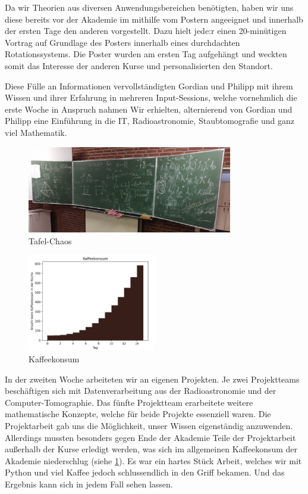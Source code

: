 Da wir Theorien aus diversen Anwendungsbereichen benötigten, haben wir uns diese bereits vor der Akademie im mithilfe vom Postern angeeignet und innerhalb der ersten Tage den anderen vorgestellt.
Dazu hielt jede:r einen 20-minütigen Vortrag auf Grundlage des Posters innerhalb eines durchdachten Rotationssystems.
Die Poster wurden am ersten Tag aufgehängt und weckten somit das Interesse der anderen Kurse und personalisierten den Standort.

Diese Fülle an Informationen vervollständigten Gordian und Philipp mit ihrem Wissen und ihrer Erfahrung in mehreren Input-Sessions, welche vornehmlich die erste Woche in Anspruch nahmen
Wir erhielten, alternierend von Gordian und Philipp eine Einführung in die IT, Radioastronomie, Staubtomografie und ganz viel Mathematik.

\begin{figure}[htb]
    \centering
    \includegraphics[width=0.8\textwidth]{k4.2/tafelbild.png}
    \caption{Tafel-Chaos}
\end{figure}

\begin{figure}[htb]
    \centering
	\includegraphics[width=0.5\textwidth]{k4.2/kaffee.png}
	\caption{Kaffeekonsum}
    \label{k4.2.fig.kaffee}
\end{figure}

In der zweiten Woche arbeiteten wir an eigenen Projekten.
Je zwei Projektteams beschäftigen sich mit Datenverarbeitung aus der Radioastronomie und der Computer-Tomographie.
Das fünfte Projektteam erarbeitete weitere mathematische Konzepte, welche für beide Projekte essenziell waren.
Die Projektarbeit gab uns die Möglichkeit, unser Wissen eigenständig anzuwenden.
Allerdings mussten besonders gegen Ende der Akademie Teile der Projektarbeit außerhalb der Kurse erledigt werden, was sich im allgemeinen Kaffeekonsum der Akademie niederschlug (siehe \cref{k4.2.fig.kaffee}).
Es war ein hartes Stück Arbeit, welches wir mit Python und viel Kaffee jedoch schlussendlich in den Griff bekamen.
Und das Ergebnis kann sich in jedem Fall sehen lassen.
